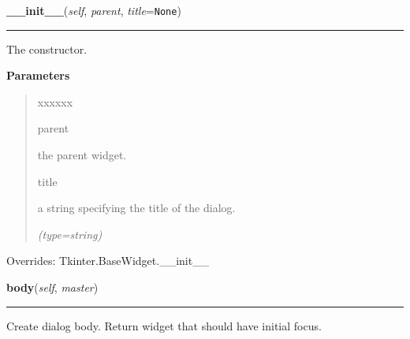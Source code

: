     \vspace{0.5ex}

\hspace{.8\funcindent}\begin{boxedminipage}{\funcwidth}

    \raggedright \textbf{\_\_init\_\_}(\textit{self}, \textit{parent}, \textit{title}={\tt None})

    \vspace{-1.5ex}

    \rule{\textwidth}{0.5\fboxrule}
\setlength{\parskip}{2ex}
    The constructor.

\setlength{\parskip}{1ex}
      \textbf{Parameters}
      \vspace{-1ex}

      \begin{quote}
        \begin{Ventry}{xxxxxx}

          \item[parent]

          the parent widget.

          \item[title]

          a string specifying the title of the dialog.

            {\it (type=string)}

        \end{Ventry}

      \end{quote}

      Overrides: Tkinter.BaseWidget.\_\_init\_\_

    \end{boxedminipage}

    \label{nMOLDYN:GUI:CheckJobsStatusDialog:CheckJobsStatusDialog:body}

    \vspace{0.5ex}

\hspace{.8\funcindent}\begin{boxedminipage}{\funcwidth}

    \raggedright \textbf{body}(\textit{self}, \textit{master})

    \vspace{-1.5ex}

    \rule{\textwidth}{0.5\fboxrule}
\setlength{\parskip}{2ex}
    Create dialog body. Return widget that should have initial focus.

\setlength{\parskip}{1ex}
    \end{boxedminipage}

